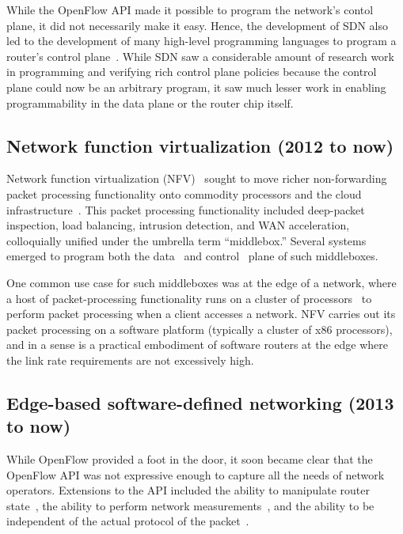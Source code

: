 While the OpenFlow API made it possible to program the network's contol plane,
it did not necessarily make it easy. Hence, the development of SDN also led to
the development of many high-level programming languages to program a router's
control plane~\cite{frenetic, pyretic}. While SDN saw a considerable amount of
research work in programming and verifying rich control plane policies because
the control plane could now be an arbitrary program, it saw much lesser work in
enabling programmability in the data plane or the router chip itself.

\subsection{Network function virtualization (2012 to now)}
Network function virtualization (NFV)~\cite{nfv_etsi_2012} sought to move
richer non-forwarding packet processing functionality onto commodity processors
and the cloud infrastructure~\cite{aplomb}. This packet processing
functionality included deep-packet inspection, load balancing, intrusion
detection, and WAN acceleration, colloquially unified under the umbrella term
``middlebox.'' Several systems emerged to program both the
data~\cite{netbricks} and control~\cite{opennf} plane of such middleboxes.

One common use case for such middleboxes was at the edge of a network, where a
host of packet-processing functionality runs on a cluster of
processors~\cite{e2} to perform packet processing when a client accesses a
network. NFV carries out its packet processing on a software platform
(typically a cluster of x86 processors), and in a sense is a practical
embodiment of software routers at the edge where the link rate requirements are
not excessively high.

\subsection{Edge-based software-defined networking (2013 to now)}
While OpenFlow provided a foot in the door, it soon became clear that the
OpenFlow API was not expressive enough to capture all the needs of network
operators. Extensions to the API included the ability to manipulate router
state~\cite{fast}, the ability to perform network
measurements~\cite{opensketch}, and the ability to be independent of the actual
protocol of the packet~\cite{pof}.

